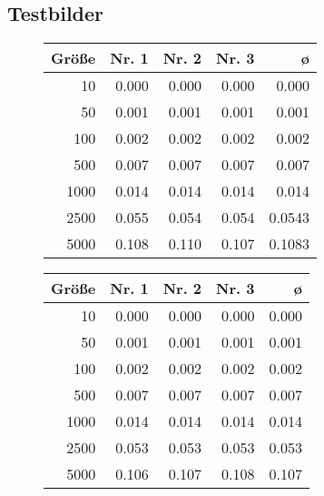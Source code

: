 \documentclass[a4paper, 10pt, twoside, onecolumn, parskip]{scrartcl}
\begin{document}
    \subsection{Testbilder} \label{subsec:testbilder}

    \begin{figure}[H]
        \begin{minipage}{.45\textwidth}
            \begin{center}
                \begin{tabular}{|r|r|r|r|r|}
                    \hline
                    Größe & Nr. 1 & Nr. 2 & Nr. 3 & ø \\\hline
                    10 & 0.000 & 0.000 & 0.000 & 0.000 \\\hline
                    50 & 0.001 & 0.001 & 0.001 & 0.001 \\\hline
                    100 & 0.002 & 0.002 & 0.002 & 0.002 \\\hline
                    500 & 0.007 & 0.007 & 0.007 & 0.007 \\\hline
                    1000 & 0.014 & 0.014 & 0.014 & 0.014 \\\hline
                    2500 & 0.055 & 0.054 & 0.054 & 0.0543 \\\hline
                    5000 & 0.108 & 0.110 & 0.107 & 0.1083 \\\hline
                \end{tabular}
            \end{center}
        \end{minipage}\hfill%
        \begin{minipage}{.45\textwidth}
            \begin{center}
                \begin{tabular}{|r|r|r|r|r|}
                    \hline
                    Größe & Nr. 1 & Nr. 2 & Nr. 3 & ø \\\hline
                    10 & 0.000 & 0.000 & 0.000 & 0.000 \\\hline
                    50 & 0.001 & 0.001 & 0.001 & 0.001 \\\hline
                    100 & 0.002 & 0.002 & 0.002 & 0.002 \\\hline
                    500 & 0.007 & 0.007 & 0.007 & 0.007 \\\hline
                    1000 & 0.014 & 0.014 & 0.014 & 0.014 \\\hline
                    2500 & 0.053 & 0.053 & 0.053 & 0.053 \\\hline
                    5000 & 0.106 & 0.107 & 0.108 & 0.107 \\\hline
                \end{tabular}
            \end{center}
        \end{minipage}
    \end{figure}
\end{document}
